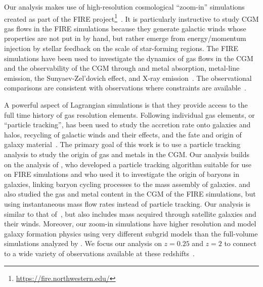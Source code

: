 \documentclass[fleqn,usenatbib]{mnras}
\begin{document}
Our analysis makes use of high-resolution cosmological ``zoom-in'' simulations \citep[][]{1993ApJ...412..455K, 2014MNRAS.437.1894O} created as part of the FIRE project\footnote{\url{https://fire.northwestern.edu/}}~\citep[][]{Hopkins2014,Hopkins2017}.
It is particularly instructive to study CGM gas flows in the FIRE simulations because they generate galactic winds whose properties are not put in by hand, but rather emerge from energy/momentum injection by stellar feedback on the scale of star-forming regions. 
The FIRE simulations have been used to investigate the dynamics of gas flows in the CGM~\citep{Muratov2015,Muratov2016,Angles-Alcazar2017,Stewart2016} and the observability of the CGM through  and metal absorption, metal-line emission, the Sunyaev-Zel'dovich effect, and X-ray emission~\citep{Faucher-Giguere2015,Faucher-Giguere2016,Sravan2016,VandeVoort2016,Hafen2016}.
The observational comparisons are consistent with observations where constraints are available~\citep{Faucher-Giguere2015,Faucher-Giguere2016,Hafen2016}.

A powerful aspect of Lagrangian simulations is that they provide access to the full time history of gas resolution elements.
Following individual gas elements, or ``particle tracking'', has been used to study the accretion rate onto galaxies and halos,
recycling of galactic winds and their effects,
and the fate and origin of galaxy material~\citep[e.g.][]{Keres2005,Oppenheimer2010,Ubler2014,Nelson2015,Angles-Alcazar2017,DeFelippis2017,Oppenheimer2017,Crain2017,Brennan2018}.
The primary goal of this work is to use a particle tracking analysis to study the origin of gas and metals in the CGM. 
Our analysis builds on the analysis of \cite{Angles-Alcazar2017}, who developed a particle tracking algorithm suitable for use on FIRE simulations and who used it to investigate the origin of baryons in galaxies, linking baryon cycling processes to the mass assembly of galaxies.
\cite{Muratov2015} and \cite{Muratov2016} also studied the gas and metal content in the CGM of the FIRE simulations, but using instantaneous mass flow rates instead of particle tracking. 
Our analysis is similar to that of~\cite{Ford2014}, but also includes mass acquired through satellite galaxies and their winds.
Moreover, our zoom-in simulations have higher resolution and model galaxy formation physics using very different subgrid models than the full-volume simulations analyzed by \cite{Ford2014}.
We focus our analysis on $z=0.25$ and $z=2$ to connect to a wide variety of observations available at these redshifts~\citep[e.g.][]{Tumlinson2013,Steidel2010, Prochaska2017,Rudie2012,OMeara2013,Lehner2016,Chen2018}.
\end{document}
